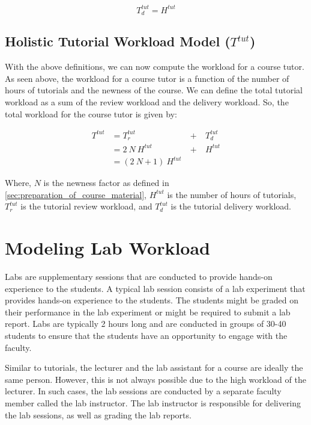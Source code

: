 \begin{equation}
  \label{eqn:tutorial-delivery-workload}
  T_d^{tut} = H^{tut}
\end{equation}

\subsection{Holistic Tutorial Workload Model (\texorpdfstring{\(T^{tut}\)}{})}

With the above definitions, we can now compute the workload for a course tutor. As seen above, the workload for a course tutor is a function of the number of hours of tutorials and the newness of the course. We can define the total tutorial workload as a sum of the review workload and the delivery workload. So, the total workload for the course tutor is given by:

\begin{equation}
  \begin{aligned}
    T^{tut} & = T_r^{tut}           & \ +\  & T_d^{tut} \\
            & = 2\ N\ H^{tut}       & \ +\  & H^{tut}   \\
            & = (2\ N + 1)\ H^{tut}
  \end{aligned}
  \label{eqn:tutorial-workload}
\end{equation}

Where, \(N\) is the newness factor as defined in \autoref{sec:preparation_of_course_material}, \(H^{tut}\) is the number of hours of tutorials, \(T_r^{tut}\) is the tutorial review workload, and \(T_d^{tut}\) is the tutorial delivery workload.

\section{Modeling Lab Workload}

Labs are supplementary sessions that are conducted to provide hands-on experience to the students. A typical lab session consists of a lab experiment that provides hands-on experience to the students. The students might be graded on their performance in the lab experiment or might be required to submit a lab report. Labs are typically 2 hours long and are conducted in groups of 30-40 students to ensure that the students have an opportunity to engage with the faculty.

Similar to tutorials, the lecturer and the lab assistant for a course are ideally the same person. However, this is not always possible due to the high workload of the lecturer. In such cases, the lab sessions are conducted by a separate faculty member called the lab instructor. The lab instructor is responsible for delivering the lab sessions, as well as grading the lab reports.

